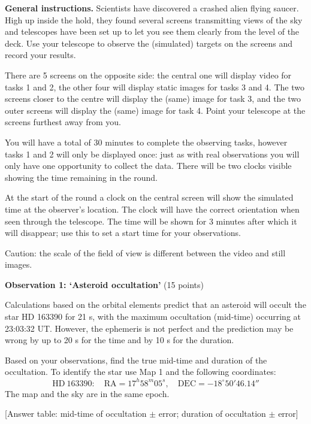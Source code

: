 \textbf{General instructions.} Scientists have discovered a crashed alien
flying saucer. High up inside the hold, they found several screens
transmitting views of the sky and telescopes have been set up to let you see
them clearly from the level of the deck. Use your telescope to observe the
(simulated) targets on the screens and record your results.

There are 5 screens on the opposite side: the central one will display video
for tasks 1 and 2, the other four will display static images for tasks 3 and
4. The two screens closer to the centre will display the (same) image for
task 3, and the two outer screens will display the (same) image for task 4.
Point your telescope at the screens furthest away from you.

You will have a total of 30 minutes to complete the observing tasks, however
tasks 1 and 2 will only be displayed once: just as with real observations
you will only have one opportunity to collect the data. There will be two
clocks visible showing the time remaining in the round.

At the start of the round a clock on the central screen will show the
simulated time at the observer's location. The clock will have the correct
orientation when seen through the telescope. The time will be shown for 3
minutes after which it will disappear; use this to set a start time for your
observations.

Caution: the scale of the field of view is different between the video and
still images.

\medskip
\textbf{Observation 1: `Asteroid occultation'} (15 points)

Calculations based on the orbital elements predict that an asteroid will
occult the star HD 163390 for 21 s, with the maximum occultation (mid-time)
occurring at 23:03:32 UT. However, the ephemeris is not perfect and the
prediction may be wrong by up to 20 s for the time and by 10 s for the
duration.

Based on your observations, find the true mid-time and duration of the
occultation. To identify the star use Map 1 and the following coordinates:
\[ \mathrm{HD\ 163390:}\quad \mathrm{RA} = 17^h58^m05^s, \quad
   \mathrm{DEC} = -18^\circ 50' 46.14'' \]
The map and the sky are in the same epoch.

[Answer table: mid-time of occultation $\pm$ error; duration of occultation
$\pm$ error]


